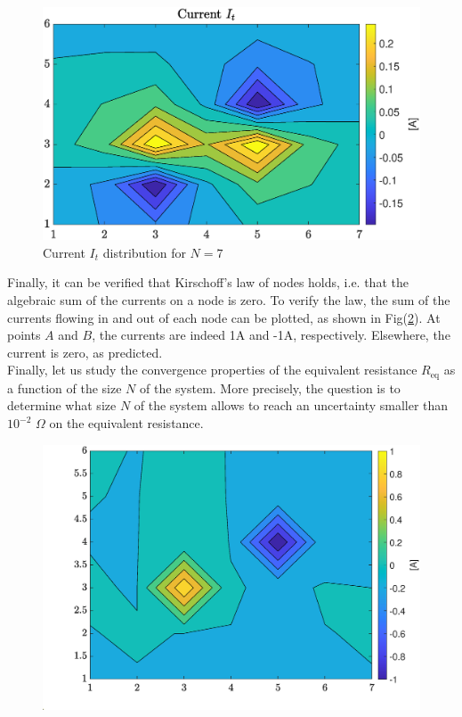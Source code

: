 \documentclass{article}
\begin{document}
\begin{spacing}{1.1}
\begin{figure}[H]
            \centering
            \includegraphics[scale=0.45]{It.eps} 
            \caption{\label{It}Current $I_t$ distribution for $N=7$}
 \end{figure}

\noindent Finally, it can be verified that Kirschoff's law of nodes holds, i.e. that the algebraic sum of the currents on a node is zero. To verify the law, the sum of the currents flowing in and out of each node can be plotted, as shown in Fig(\ref{kirchoff}). At points $A$ and $B$, the currents are indeed 1A and -1A, respectively. Elsewhere, the current is zero, as predicted.\\

\noindent Finally, let us study the convergence properties of the equivalent resistance $R_{\text{eq}}$ as a function of the size $N$ of the system. More precisely, the question is to determine what size $N$ of the system allows to reach an uncertainty smaller than $10^{-2}$ $\Omega$ on the equivalent resistance.\\

\begin{figure}[H]
            \centering
            \includegraphics[scale=0.45]{Kirchoff.eps} 
            \caption{\label{kirchoff}}
 \end{figure}



\end{spacing}
\end{document}
